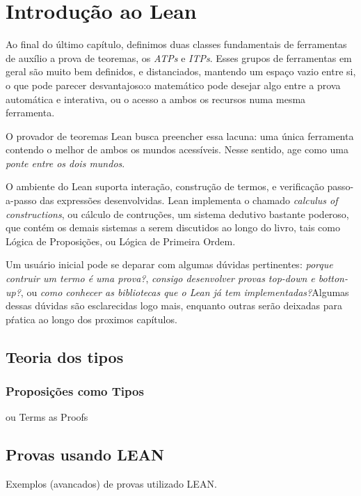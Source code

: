 \chapter{Introdução ao Lean}

Ao final do último capítulo, definimos duas classes fundamentais de ferramentas de auxílio a prova de teoremas, os \textit{ATPs} e \textit{ITPs}.
Esses grupos de ferramentas em geral são muito bem definidos, e distanciados, mantendo um espaço vazio entre si, o que pode parecer desvantajoso:o  matemático pode desejar algo entre a prova automática e interativa, ou o acesso a ambos os recursos numa mesma ferramenta.

O provador de teoremas Lean busca preencher essa lacuna: uma única ferramenta contendo o melhor de ambos os mundos acessíveis.
Nesse sentido, age como uma \textit{ponte entre os dois mundos}.

O ambiente do Lean suporta interação, construção de termos, e verificação passo-a-passo das expressões desenvolvidas.
Lean implementa o chamado \textit{calculus of constructions}, ou cálculo de contruções, um sistema dedutivo bastante poderoso, que contém os demais sistemas a serem discutidos ao longo do livro, tais como Lógica de Proposições, ou Lógica de Primeira Ordem.

Um usuário inicial pode se deparar com algumas dúvidas pertinentes: \textit{porque contruir um termo é uma prova?}, \textit{consigo desenvolver provas top-down e botton-up?}, ou \textit{como conhecer as bibliotecas que o Lean já tem implementadas?}Algumas dessas dúvidas são esclarecidas logo mais, enquanto outras serão deixadas para pŕatica ao longo dos proximos capítulos.

\section{Teoria dos tipos}


\subsection{Proposições como Tipos}
ou Terms as Proofs

\section{Provas usando LEAN}
Exemplos (avancados) de provas utilizado LEAN.

